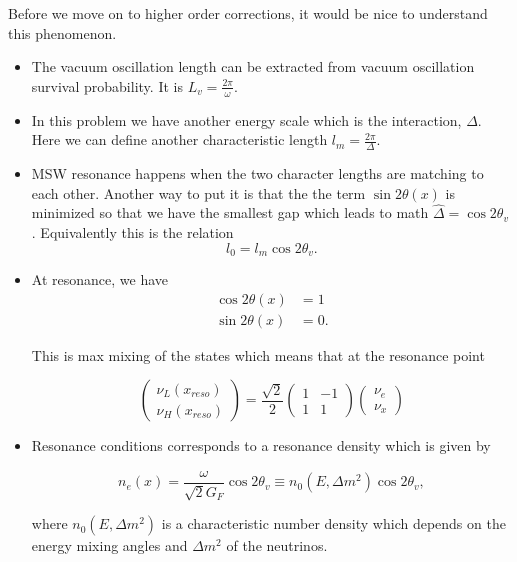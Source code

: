 \documentclass{tufte-handout}
\begin{document}
Before we move on to higher order corrections, it would be nice to understand this phenomenon.


\begin{itemize}
\item
The vacuum oscillation length can be extracted from vacuum oscillation survival probability. It is $L_v = \frac{2\pi}{\omega}$.
\item
In this problem we have another energy scale which is the interaction, $\Delta$. Here we can define another characteristic length $l_m = \frac{2\pi}{\Delta}$.
\item 
MSW resonance happens when the two character lengths are matching to each other. Another way to put it is that the the term $\sin 2\theta(x)$ is minimized so that we have the smallest gap which leads to math $\hat\Delta = \cos 2\theta_v$. Equivalently this is the relation
\begin{equation*}
l_0 = l_m\cos 2\theta_v.
\end{equation*}
\item
At resonance, we have
\begin{align*}
\cos 2\theta(x) &= 1 \\
\sin 2\theta(x) &= 0.
\end{align*}

This is max mixing of the states which means that at the resonance point

\begin{equation*}
\begin{pmatrix} \nu_L(x_{reso}) \\ \nu_H(x_{reso}) \end{pmatrix} = \frac{\sqrt{2}}{2}\begin{pmatrix} 1 & -1 \\ 1 & 1 \end{pmatrix} \begin{pmatrix}\nu_e \\ \nu_x \end{pmatrix}
\end{equation*}

\item

Resonance conditions corresponds to a resonance density which is given by

\begin{equation*}
n_e(x) = \frac{\omega}{\sqrt{2}G_F } \cos 2\theta_v \equiv n_0(E,\Delta m^2) \cos 2\theta_v,
\end{equation*}

where $n_0(E,\Delta m^2)$ is a characteristic number density which depends on the energy mixing angles and $\Delta m^2$ of the neutrinos.



\end{itemize}
\end{document}
